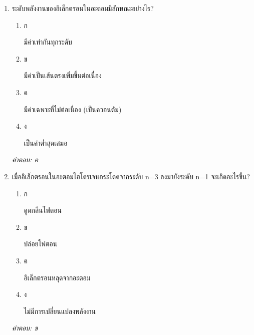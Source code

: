 \documentclass[12pt]{article}
\begin{document}
\begin{enumerate}[label=\arabic*., itemsep=0.5\baselineskip, topsep=0.5\baselineskip, leftmargin=*]
\item ระดับพลังงานของอิเล็กตรอนในอะตอมมีลักษณะอย่างไร?
\begin{enumerate}[label=\alph*)., itemsep=0.3\baselineskip, topsep=0.3\baselineskip]
\item ก\ 
\begin{minipage}[t]{0.9\linewidth}
\raggedright มีค่าเท่ากันทุกระดับ
\end{minipage}
\item ข\ 
\begin{minipage}[t]{0.9\linewidth}
\raggedright มีค่าเป็นเส้นตรงเพิ่มขึ้นต่อเนื่อง
\end{minipage}
\item ค\ 
\begin{minipage}[t]{0.9\linewidth}
\raggedright มีค่าเฉพาะที่ไม่ต่อเนื่อง (เป็นควอนตัม)
\end{minipage}
\item ง\ 
\begin{minipage}[t]{0.9\linewidth}
\raggedright เป็นค่าต่ำสุดเสมอ
\end{minipage}
\end{enumerate}
\vspace{-0.3\baselineskip}
\begin{small}
\textit{คำตอบ: ค}
\end{small}

\item เมื่ออิเล็กตรอนในอะตอมไฮโดรเจนกระโดดจากระดับ n=3 ลงมายังระดับ n=1 จะเกิดอะไรขึ้น?
\begin{enumerate}[label=\alph*)., itemsep=0.3\baselineskip, topsep=0.3\baselineskip]
\item ก\ 
\begin{minipage}[t]{0.9\linewidth}
\raggedright ดูดกลืนโฟตอน
\end{minipage}
\item ข\ 
\begin{minipage}[t]{0.9\linewidth}
\raggedright ปล่อยโฟตอน
\end{minipage}
\item ค\ 
\begin{minipage}[t]{0.9\linewidth}
\raggedright อิเล็กตรอนหลุดจากอะตอม
\end{minipage}
\item ง\ 
\begin{minipage}[t]{0.9\linewidth}
\raggedright ไม่มีการเปลี่ยนแปลงพลังงาน
\end{minipage}
\end{enumerate}
\vspace{-0.3\baselineskip}
\begin{small}
\textit{คำตอบ: ข}
\end{small}


\end{enumerate}
\end{document}
